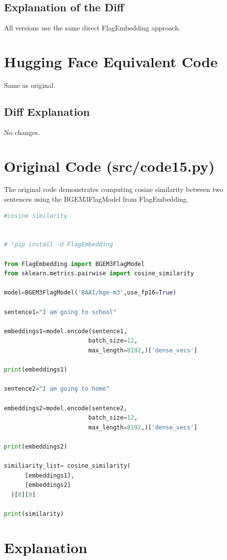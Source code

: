 \documentclass[11pt, a4paper]{article}
\begin{document}
\subsection{Explanation of the Diff}
All versions use the same direct FlagEmbedding approach.

\section{Hugging Face Equivalent Code}
Same as original.

\subsection{Diff Explanation}
No changes.


\newpage
\section{Original Code (src/code15.py)}

The original code demonstrates computing cosine similarity between two sentences using the BGEM3FlagModel from FlagEmbedding.

\begin{lstlisting}[language=Python]
#cosine similarity


# !pip install -U FlagEmbedding

from FlagEmbedding import BGEM3FlagModel
from sklearn.metrics.pairwise import cosine_similarity

model=BGEM3FlagModel('BAAI/bge-m3',use_fp16=True)

sentence1="I am going to school"

embeddings1=model.encode(sentence1,
                        batch_size=12,
                        max_length=8192,)['dense_vecs']

print(embeddings1)

sentence2="I am going to home"

embeddings2=model.encode(sentence2,
                        batch_size=12,
                        max_length=8192,)['dense_vecs']

print(embeddings2)

similiarity_list= cosine_similarity(
      [embeddings1],
      [embeddings2]
  )[0][0]

print(similarity)
\end{lstlisting}

\section{Explanation}
\end{document}
